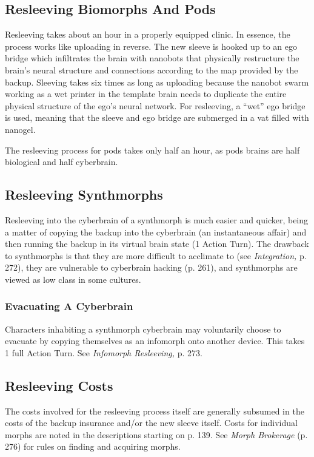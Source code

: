\subsection{Resleeving Biomorphs And Pods}

Resleeving takes about an hour in a properly equipped 
clinic. In essence, the process works like uploading in 
reverse. The new sleeve is hooked up to an ego bridge 
which infiltrates the brain with nanobots that physically
restructure the brain's neural structure and connections
according to the map provided by the backup.
Sleeving takes six times as long as uploading because 
the nanobot swarm working as a wet printer in the 
template brain needs to duplicate the entire physical 
structure of the ego's neural network. For resleeving, a 
``wet'' ego bridge is used, meaning that the sleeve and 
ego bridge are submerged in a vat filled with nanogel.

The resleeving process for pods takes only half an hour, 
as pods brains are half biological and half cyberbrain.

\subsection{Resleeving Synthmorphs}

Resleeving into the cyberbrain of a synthmorph is much 
easier and quicker, being a matter of copying the backup 
into the cyberbrain (an instantaneous affair) and then 
running the backup in its virtual brain state (1 Action 
Turn). The drawback to synthmorphs is that they are 
more difficult to acclimate to (see \textit{Integration,} p. 272), 
they are vulnerable to cyberbrain hacking (p. 261), and 
synthmorphs are viewed as low class in some cultures.

\subsubsection{Evacuating A Cyberbrain}

Characters inhabiting a synthmorph cyberbrain may 
voluntarily choose to evacuate by copying themselves 
as an infomorph onto another device. This takes 1 full 
Action Turn. See \textit{Infomorph Resleeving,} p. 273.

\subsection{Resleeving Costs}

The costs involved for the resleeving process itself are 
generally subsumed in the costs of the backup insurance
and/or the new sleeve itself. Costs for individual
morphs are noted in the descriptions starting on p. 
139. See \textit{Morph Brokerage} (p. 276) for rules on finding
and acquiring morphs.

